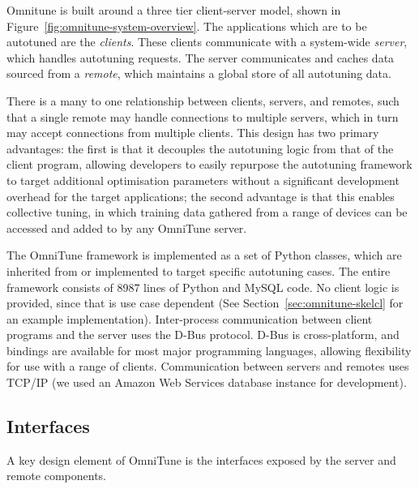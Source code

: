 \documentclass[nonatbib,preprint,9pt]{sigplanconf}
\begin{document}
Omnitune is built around a three tier client-server model, shown in
Figure~\ref{fig:omnitune-system-overview}. The applications which are
to be autotuned are the \emph{clients}. These clients communicate with
a system-wide \emph{server}, which handles autotuning requests. The
server communicates and caches data sourced from a \emph{remote},
which maintains a global store of all autotuning data.

There is a many to one relationship between clients, servers, and
remotes, such that a single remote may handle connections to multiple
servers, which in turn may accept connections from multiple
clients. This design has two primary advantages: the first is that it
decouples the autotuning logic from that of the client program,
allowing developers to easily repurpose the autotuning framework to
target additional optimisation parameters without a significant
development overhead for the target applications; the second advantage
is that this enables collective tuning, in which training data
gathered from a range of devices can be accessed and added to by any
OmniTune server.

The OmniTune framework is implemented as a set of Python classes,
which are inherited from or implemented to target specific autotuning
cases. The entire framework consists of 8987 lines of Python and MySQL
code. No client logic is provided, since that is use case dependent
(See Section~\ref{sec:omnitune-skelcl} for an example
implementation). Inter-process communication between client programs
and the server uses the D-Bus protocol. D-Bus is cross-platform, and
bindings are available for most major programming languages, allowing
flexibility for use with a range of clients. Communication between
servers and remotes uses TCP/IP (we used an Amazon Web Services
database instance for development).


\subsection{Interfaces}

A key design element of OmniTune is the interfaces exposed by the
server and remote components.
\end{document}
